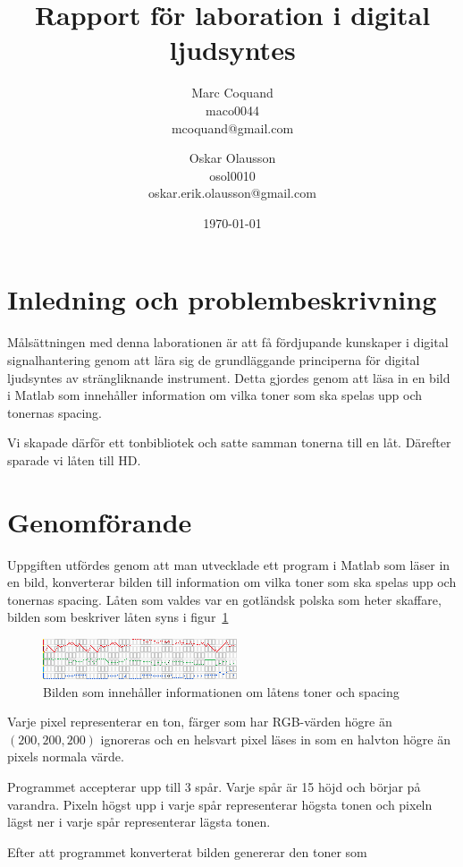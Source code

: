 \documentclass[12pt]{article}
\title{Rapport för laboration i digital ljudsyntes}
\author{
    Marc Coquand \\
    maco0044 \\
    mcoquand@gmail.com\\
    \and
    Oskar Olausson \\
    osol0010 \\
    oskar.erik.olausson@gmail.com\\
}
\date{\today}
\begin{document}
\lstset{language=Matlab}
\maketitle
\tableofcontents

\newpage

\section{Inledning och problembeskrivning}

Målsättningen med denna laborationen är att få fördjupande kunskaper i digital
signalhantering genom att lära sig de grundläggande principerna för digital
ljudsyntes av strängliknande instrument. Detta gjordes genom att läsa in en bild
i Matlab som innehåller information om vilka toner som ska spelas upp och
tonernas spacing. 

Vi skapade därför ett tonbibliotek och satte samman tonerna till en låt.
Därefter sparade vi låten till HD.


\section{Genomförande}

Uppgiften utfördes genom att man utvecklade ett program i Matlab som läser in en
bild, konverterar bilden till information om vilka toner som ska spelas upp och
tonernas spacing. Låten som valdes var en gotländsk polska som heter skaffare,
bilden som beskriver låten syns i figur~\ref{fig:skaffare}

\begin{figure}[!htb]
    \centering
    \includegraphics[scale=1.5]{../SKAFFARE.png}
    \caption{Bilden som innehåller informationen om låtens toner och spacing}
    \label{fig:skaffare}
\end{figure}

Varje pixel representerar en ton, färger som har RGB-värden högre än
$(200,200,200)$ ignoreras och en helsvart pixel läses in som en halvton högre än
pixels normala värde. 

Programmet accepterar upp till 3 spår. Varje spår är 15 höjd och börjar på
varandra. Pixeln högst upp i varje spår representerar högsta tonen och pixeln
lägst ner i varje spår representerar lägsta tonen.

Efter att programmet konverterat bilden genererar den toner som 
\end{document}
